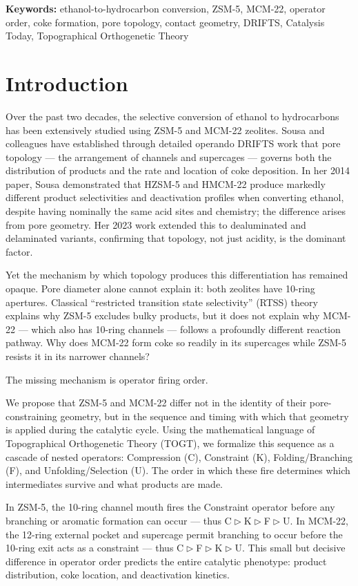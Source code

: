 \documentclass[11pt]{article}
\newcommand{\comp}{\mathrel{\triangleright}} %
\begin{document}
\noindent\textbf{Keywords:} ethanol-to-hydrocarbon conversion, ZSM-5, MCM-22, operator order, coke formation, pore topology, contact geometry, DRIFTS, Catalysis Today, Topographical Orthogenetic Theory

\section{Introduction}

Over the past two decades, the selective conversion of ethanol to hydrocarbons has been extensively studied using ZSM-5 and MCM-22 zeolites. Sousa and colleagues have established through detailed operando DRIFTS work \cite{sousa2014,sousa2023} that pore topology --- the arrangement of channels and supercages --- governs both the distribution of products and the rate and location of coke deposition. In her 2014 paper, Sousa demonstrated that HZSM-5 and HMCM-22 produce markedly different product selectivities and deactivation profiles when converting ethanol, despite having nominally the same acid sites and chemistry; the difference arises from pore geometry. Her 2023 work extended this to dealuminated and delaminated variants, confirming that topology, not just acidity, is the dominant factor.

Yet the mechanism by which topology produces this differentiation has remained opaque. Pore diameter alone cannot explain it: both zeolites have 10-ring apertures. Classical ``restricted transition state selectivity'' (RTSS) theory \cite{weisz1960,csicsery1984} explains why ZSM-5 excludes bulky products, but it does not explain why MCM-22 --- which also has 10-ring channels --- follows a profoundly different reaction pathway. Why does MCM-22 form coke so readily in its supercages while ZSM-5 resists it in its narrower channels?

The missing mechanism is operator firing order.

We propose that ZSM-5 and MCM-22 differ not in the identity of their pore-constraining geometry, but in the sequence and timing with which that geometry is applied during the catalytic cycle. Using the mathematical language of Topographical Orthogenetic Theory (TOGT), we formalize this sequence as a cascade of nested operators: Compression (C), Constraint (K), Folding/Branching (F), and Unfolding/Selection (U). The order in which these fire determines which intermediates survive and what products are made.

In ZSM-5, the 10-ring channel mouth fires the Constraint operator before any branching or aromatic formation can occur --- thus C$\comp$K$\comp$F$\comp$U. In MCM-22, the 12-ring external pocket and supercage permit branching to occur before the 10-ring exit acts as a constraint --- thus C$\comp$F$\comp$K$\comp$U. This small but decisive difference in operator order predicts the entire catalytic phenotype: product distribution, coke location, and deactivation kinetics.
\end{document}
